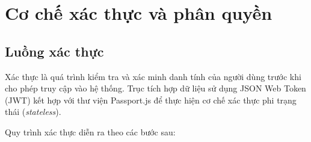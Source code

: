 \newpage
\section{Cơ chế xác thực và phân quyền}
\label{auth}

\subsection{Luồng xác thực}

Xác thực là quá trình kiểm tra và xác minh danh tính của người dùng trước khi cho phép truy cập vào hệ thống. Trục tích hợp dữ liệu sử dụng JSON Web Token (JWT) kết hợp với thư viện Passport.js để thực hiện cơ chế xác thực phi trạng thái (\textit{stateless}).

Quy trình xác thực diễn ra theo các bước sau:

